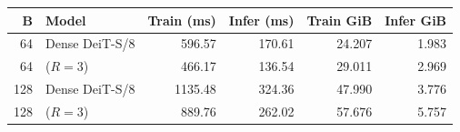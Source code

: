 \begin{tabular}{rlrrrr}
\toprule
B & Model & Train (ms) & Infer (ms) & Train GiB & Infer GiB \\
\midrule
64 & Dense DeiT-S/8 & 596.57 & 170.61 & 24.207 & 1.983 \\
64 & \mn{} ($R=3$) & 466.17 & 136.54 & 29.011 & 2.969 \\
128 & Dense DeiT-S/8 & 1135.48 & 324.36 & 47.990 & 3.776 \\
128 & \mn{} ($R=3$) & 889.76 & 262.02 & 57.676 & 5.757 \\
\bottomrule
\end{tabular}
